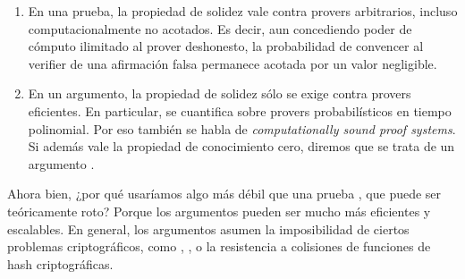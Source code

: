 \begin{enumerate}[noitemsep]
	\item En una prueba, la propiedad de solidez vale contra provers arbitrarios, incluso computacionalmente no acotados. Es decir, aun concediendo poder de cómputo ilimitado al prover deshonesto, la probabilidad de convencer al verifier de una afirmación falsa permanece acotada por un valor negligible.
	\item En un argumento, la propiedad de solidez sólo se exige contra provers eficientes. En particular, se cuantifica sobre provers probabilísticos en tiempo polinomial. Por eso también se habla de \textit{computationally sound proof systems}. Si además vale la propiedad de conocimiento cero, diremos que se trata de un argumento \ZK.
\end{enumerate}

Ahora bien, ¿por qué usaríamos algo más débil que una prueba \ZK, que puede ser teóricamente roto? Porque los argumentos \ZK pueden ser mucho más eficientes y escalables. En general, los argumentos \ZK asumen la imposibilidad de ciertos problemas criptográficos, como \ECDLP, \BDH, o la resistencia a colisiones de funciones de hash criptográficas.
